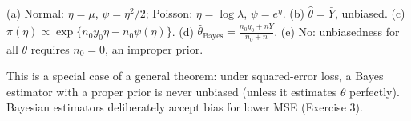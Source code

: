 \documentclass[11pt]{article}
\begin{document}
\begin{answer}
(a) Normal: $\eta=\mu$, $\psi=\eta^2/2$; Poisson: $\eta=\log\lambda$, $\psi=e^\eta$. (b) $\hat\theta=\bar Y$, unbiased. (c) $\pi(\eta)\propto\exp\{n_0y_0\eta-n_0\psi(\eta)\}$. (d) $\hat\theta_{\text{Bayes}}=\frac{n_0y_0+n\bar Y}{n_0+n}$. (e) No: unbiasedness for all $\theta$ requires $n_0=0$, an improper prior.
\end{answer}

\begin{takeaway}
This is a special case of a general theorem: under squared-error loss, a Bayes estimator with a proper prior is never unbiased (unless it estimates $\theta$ perfectly). Bayesian estimators deliberately accept bias for lower MSE (Exercise 3).
\end{takeaway}
\end{document}
